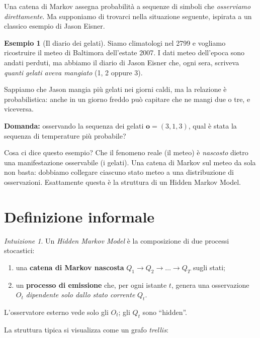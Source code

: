 \documentclass[11pt,a4paper,oneside]{book}
\theoremstyle{plain}
\theoremstyle{definition}
\newtheorem{esempio}[teorema]{Esempio}
\theoremstyle{remark}
\newtheorem*{intuizione}{Intuizione}
\newcommand{\Tlen}{T}                        %
\newcommand{\seqobs}{\mathbf{o}}             %
\begin{document}
Una catena di Markov assegna probabilità a sequenze di simboli che
\emph{osserviamo direttamente}. Ma supponiamo di trovarci nella
situazione seguente, ispirata a un classico esempio di Jason Eisner.

\begin{esempio}[Il diario dei gelati]\label{ex:icecream_motiv}
Siamo climatologi nel 2799 e vogliamo ricostruire il meteo di
Baltimora dell'estate 2007. I dati meteo dell'epoca sono andati
perduti, ma abbiamo il diario di Jason Eisner che, ogni sera, scriveva
\emph{quanti gelati aveva mangiato} (1, 2 oppure 3).

Sappiamo che Jason mangia più gelati nei giorni caldi, ma la
relazione è probabilistica: anche in un giorno freddo può capitare
che ne mangi due o tre, e viceversa.

\textbf{Domanda:} osservando la sequenza dei gelati $\seqobs = (3,1,3)$,
qual è stata la sequenza di temperature più probabile?
\end{esempio}

Cosa ci dice questo esempio? Che il fenomeno reale (il meteo) è
\emph{nascosto} dietro una manifestazione osservabile (i gelati). Una
catena di Markov sul meteo da sola non basta: dobbiamo collegare
ciascuno stato meteo a una distribuzione di osservazioni. Esattamente
questa è la struttura di un Hidden Markov Model.

\section{Definizione informale}

\begin{intuizione}
Un \emph{Hidden Markov Model} è la composizione di due processi
stocastici:
\begin{enumerate}[leftmargin=*]
    \item una \textbf{catena di Markov nascosta} $Q_1\to Q_2\to\dots
          \to Q_{\Tlen}$ sugli stati;
    \item un \textbf{processo di emissione} che, per ogni istante
          $t$, genera una osservazione $O_t$ \emph{dipendente solo
          dallo stato corrente} $Q_t$.
\end{enumerate}
L'osservatore esterno vede solo gli $O_t$; gli $Q_t$ sono ``hidden''.
\end{intuizione}

La struttura tipica si visualizza come un grafo \emph{trellis}:
\end{document}
